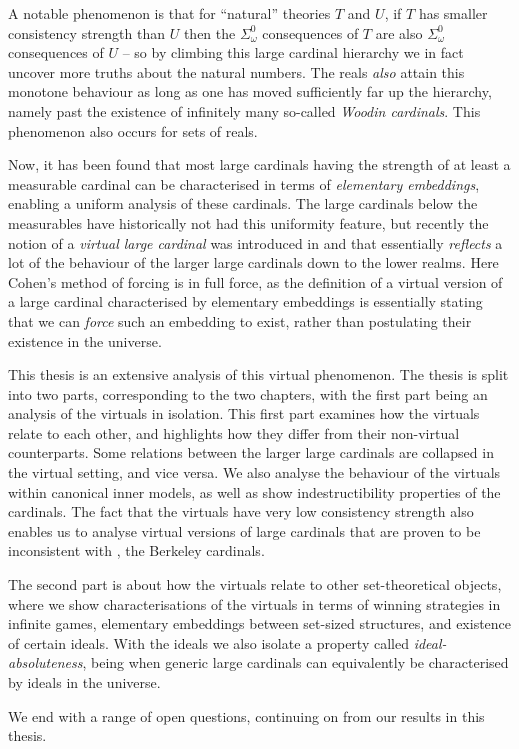 \documentclass[../main]{subfiles}
\begin{document}
\begin{onehalfspacing}
\quad A notable phenomenon is that for ``natural'' theories $T$ and $U$, if $T$ has smaller consistency strength than $U$ then the $\Sigma^0_\omega$ consequences of $T$ are also $\Sigma^0_\omega$ consequences of $U$ -- so by climbing this large cardinal hierarchy we in fact uncover more truths about the natural numbers. The reals \textit{also} attain this monotone behaviour as long as one has moved sufficiently far up the hierarchy, namely past the existence of infinitely many so-called \textit{Woodin cardinals}. This phenomenon also occurs for sets of reals.

\quad Now, it has been found that most large cardinals having the strength of at least a measurable cardinal can be characterised in terms of \textit{elementary embeddings}, enabling a uniform analysis of these cardinals. The large cardinals below the measurables have historically not had this uniformity feature, but recently the notion of a \textit{virtual large cardinal} was introduced in \cite{Schindler} and \cite{GitmanSchindler} that essentially \textit{reflects} a lot of the behaviour of the larger large cardinals down to the lower realms. Here Cohen's method of forcing is in full force, as the definition of a virtual version of a large cardinal characterised by elementary embeddings is essentially stating that we can \textit{force} such an embedding to exist, rather than postulating their existence in the universe.

\quad This thesis is an extensive analysis of this virtual phenomenon. The thesis is split into two parts, corresponding to the two chapters, with the first part being an analysis of the virtuals in isolation. This first part examines how the virtuals relate to each other, and highlights how they differ from their non-virtual counterparts. Some relations between the larger large cardinals are collapsed in the virtual setting, and vice versa. We also analyse the behaviour of the virtuals within canonical inner models, as well as show indestructibility properties of the cardinals. The fact that the virtuals have very low consistency strength also enables us to analyse virtual versions of large cardinals that are proven to be inconsistent with \zf, the Berkeley cardinals.

\quad The second part is about how the virtuals relate to other set-theoretical objects, where we show characterisations of the virtuals in terms of winning strategies in infinite games, elementary embeddings between set-sized structures, and existence of certain ideals. With the ideals we also isolate a property called \textit{ideal-absoluteness}, being when generic large cardinals can equivalently be characterised by ideals in the universe.

\quad We end with a range of open questions, continuing on from our results in this thesis.

\end{onehalfspacing}
\setlength{\parindent}{0pt}
\end{document}
